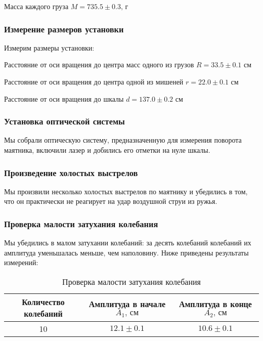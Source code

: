 \documentclass[a4paper]{article}
\begin{document}
\item Масса каждого груза $M = 735.5 \pm{0.3} \text{, г}$

\subsubsection{Измерение размеров установки}

Измерим размеры установки:

\item Расстояние от оси вращения до центра масс одного из грузов $R = 33.5 \pm{0.1} \text{ см}$

\item Расстояние от оси вращения до центра одной из мишеней $r = 22.0 \pm{0.1} \text{ см}$

\item Расстояние от оси вращения до шкалы $d = 137.0 \pm{0.2} \text{ см}$

\subsubsection{Установка оптической системы}

Мы собрали оптическую систему, предназначенную для измерения поворота маятника, включили лазер и добились его отметки на нуле шкалы.

\subsubsection{Произведение холостых выстрелов}

Мы произвили несколько холостых выстрелов по маятнику и убедились в том, что он практически не реагирует на удар воздушной струи из ружья.

\subsubsection{Проверка малости затухания колебания}

Мы убедились в малом затухании колебаний: за десять колебаний колебаний их амплитуда уменьшалась меньше, чем наполовину. Ниже приведены результаты измерений:

\begin{table}[h!]
\centering
\caption{Проверка малости затухания колебания}
\begin{tabular}{|c|c|c|}
\hline
Количество колебаний & Амплитуда в начале $A_1\text{, см}$  & Амплитуда в конце $A_2\text{, см}$ \\ \hline
10  & $12.1\pm {0.1}$ & $10.6\pm {0.1}$ \\ \hline

\end{tabular}
\end{table}
\end{document}
